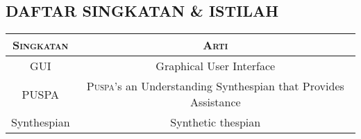 \subsection*{\textcolor{subsectioncolor}{\textsf{DAFTAR SINGKATAN \& ISTILAH}}}

\begin{tabular}{|c|c|}
\hline
{\scshape Singkatan} & {\scshape Arti}\\
\hline
GUI & Graphical User Interface\\
\hline
PUSPA & {\scshape Puspa}'s an Understanding Synthespian that Provides Assistance\\
\hline
Synthespian & Synthetic thespian\\
\hline
\end{tabular}
